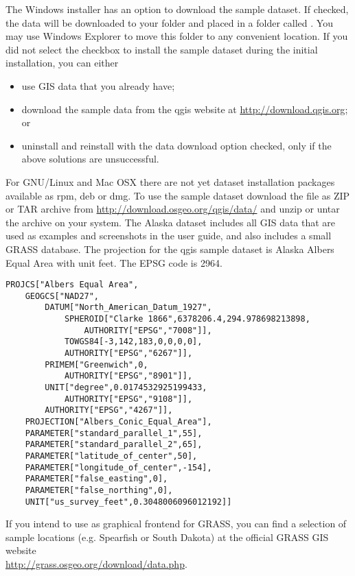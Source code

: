 \win The Windows installer has an option to download the \qg sample dataset.
If checked, the data will be downloaded to your 
folder and placed in a folder called . 
You may use Windows Explorer to move this folder to any convenient location.
If you did not select the checkbox to install the sample dataset
during the initial \qg installation, you can either
\begin{itemize}[label=--]
\item use GIS data that you already have;
\item download the sample data from the qgis website at \url{http://download.qgis.org}; or
\item uninstall \qg and reinstall with the data download option checked, only if 
the above solutions are unsuccessful.
\end{itemize}

\nix \osx For GNU/Linux and Mac OSX there are not yet dataset installation
packages available as rpm, deb or dmg. To use the sample dataset download the
file  as ZIP or TAR archive from
\url{http://download.osgeo.org/qgis/data/} and unzip or untar the archive on
your system. The Alaska dataset includes all GIS data that are used as
examples and screenshots in the user guide, and also includes a small GRASS
database. The projection for the qgis sample dataset is Alaska Albers Equal
Area with unit feet. The EPSG code is 2964.

\begin{verbatim}
PROJCS["Albers Equal Area",
    GEOGCS["NAD27",
        DATUM["North_American_Datum_1927",
            SPHEROID["Clarke 1866",6378206.4,294.978698213898,
                AUTHORITY["EPSG","7008"]],
            TOWGS84[-3,142,183,0,0,0,0],
            AUTHORITY["EPSG","6267"]],
        PRIMEM["Greenwich",0,
            AUTHORITY["EPSG","8901"]],
        UNIT["degree",0.0174532925199433,
            AUTHORITY["EPSG","9108"]],
        AUTHORITY["EPSG","4267"]],
    PROJECTION["Albers_Conic_Equal_Area"],
    PARAMETER["standard_parallel_1",55],
    PARAMETER["standard_parallel_2",65],
    PARAMETER["latitude_of_center",50],
    PARAMETER["longitude_of_center",-154],
    PARAMETER["false_easting",0],
    PARAMETER["false_northing",0],
    UNIT["us_survey_feet",0.3048006096012192]]
\end{verbatim}

If you intend to use \qg as graphical frontend for GRASS, you can find a
selection of sample locations (e.g. Spearfish or South Dakota) at the
official GRASS GIS website \\
\url{http://grass.osgeo.org/download/data.php}. 


